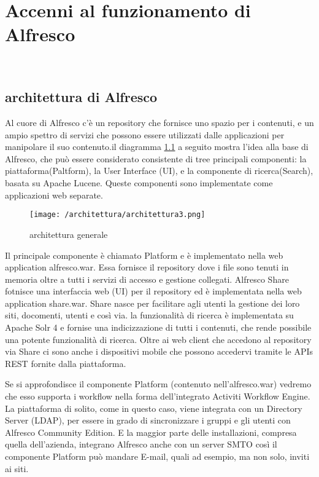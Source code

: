 \chapter{Accenni al funzionamento di Alfresco}
\label{cap:architettura}

\\

\section{architettura di Alfresco}
Al cuore di Alfresco c'è un repository che fornisce uno spazio per i contenuti, e un ampio spettro di servizi che possono essere utilizzati dalle applicazioni per manipolare il suo contenuto.il diagramma \ref{fig:architettura-generale} a seguito mostra l'idea alla base di Alfresco, che può essere considerato consistente di tree principali componenti: la piattaforma(Paltform), la User Interface (UI), e la componente di ricerca(Search), basata su Apache Lucene. Queste componenti sono implementate come applicazioni web separate.
\begin{figure}[!ht]
\centering
\texttt{[image: /architettura/architettura3.png]}
\caption{architettura generale}
\label{fig:architettura-generale}
\end{figure}
Il principale componente è chiamato Platform e è implementato nella web application alfresco.war. Essa fornisce il repository dove i file sono tenuti in memoria oltre a tutti i servizi di accesso e gestione collegati. Alfresco Share fotnisce una interfaccia web (UI) per il repository ed è implementata nella web application share.war. Share nasce per facilitare agli utenti la gestione dei loro siti, docomenti, utenti e così via.
la funzionalità di ricerca è implementata su Apache Solr 4 e fornise una indicizzazione di tutti i contenuti, che rende possibile una potente funzionalità di ricerca. Oltre ai web client che accedono al repository via Share ci sono anche i dispositivi mobile che possono accedervi tramite le APIs REST fornite dalla piattaforma.

Se si approfondisce il componente Platform (contenuto nell'alfresco.war) vedremo che esso supporta i workflow nella forma dell'integrato Activiti Workflow Engine. La piattaforma di solito, come in questo caso, viene integrata con un Directory Server (LDAP), per essere in grado di sincronizzare i gruppi e gli utenti con Alfresco Community Edition. E la maggior parte delle installazioni, compresa quella dell'azienda, integrano Alfresco anche con un server SMTO così il componente Platform può mandare E-mail, quali ad esempio, ma non solo, inviti ai siti.

